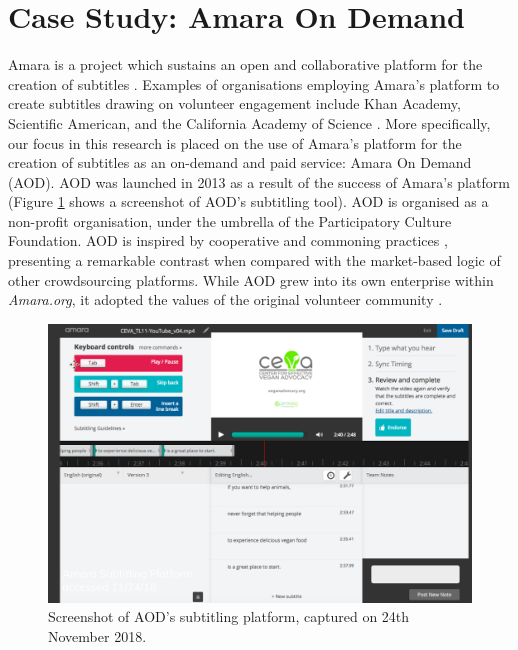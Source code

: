 
\section{Case Study: Amara On Demand}
\label{sec:case-study}

Amara is a project which sustains an open and collaborative platform for the creation of subtitles \cite{jansen_amara_2014}. Examples of organisations employing Amara's platform to create subtitles drawing on volunteer engagement include Khan Academy, Scientific American, and the California Academy of Science \cite{amara}. More specifically, our focus in this research is placed on the use of Amara's platform for the creation of subtitles as an on-demand and paid service: Amara On Demand (AOD). AOD was launched in 2013 \cite{zelickson2019} as a result of the success \cite{jansen_amara_2014} of Amara's platform (Figure \ref{fig:aod-platform} shows a screenshot of AOD's subtitling tool). AOD is organised as a non-profit organisation, under the umbrella of the Participatory Culture Foundation. AOD is inspired by cooperative and commoning practices \cite{gray2019ghost}, presenting a remarkable contrast when compared with the market-based logic of other crowdsourcing platforms. While AOD grew into its own enterprise within \textit{Amara.org}, it adopted the values of the original volunteer community \cite{amaraorg}. %


\begin{figure}[ht]
    \centering
    \includegraphics[width=\columnwidth]{figures/AOD_platform.png}
    \caption{Screenshot of AOD's subtitling platform, captured on 24th November 2018.}
    \label{fig:aod-platform}
\end{figure}

